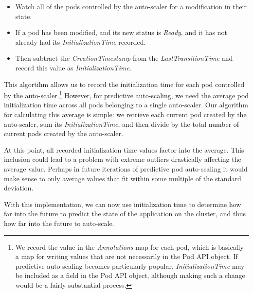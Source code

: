 \begin{itemize}
  \item Watch all of the pods controlled by the auto-scaler for a modification in
    their state.
  \item If a pod has been modified, and its new status is \textit{Ready}, and
    it has not already had its \textit{InitializationTime} recorded.
  \item Then subtract the \textit{CreationTimestamp} from the
    \textit{LastTransitionTime} and record this value as
    \textit{InitializationTime}.
\end{itemize}

This algortihm allows us to record the initialization time for each pod
controlled by the auto-scaler.\footnote{We record the value in the
  \textit{Annotations} map for each pod, which is basically a map for writing
values that are not necessarily in the Pod API object. If predictive
auto-scaling becomes particularly popular, \textit{InitializationTime} may be
included as a field in the Pod API object, although making such a change would
be a fairly substantial process.} However, for predictive auto-scaling, we need
the average pod initialization time across all pods belonging to a single
auto-scaler. Our algorithm for calculating this average is simple: we retrieve
each current pod created by the auto-scaler, sum its \textit{InitializationTime}, and
then divide by the total number of current pods created by the auto-scaler.


At this point, all recorded initialization time values factor into the average.
This inclusion could lead to a problem with extreme outliers drastically
affecting the average value. Perhaps in future iterations of predictive pod
auto-scaling it would make sense to only average values that fit within some
multiple of the standard deviation.

With this implementation, we can now use initialization time to determine how
far into the future to predict the state of the application on the cluster, and
thus how far into the future to auto-scale.
